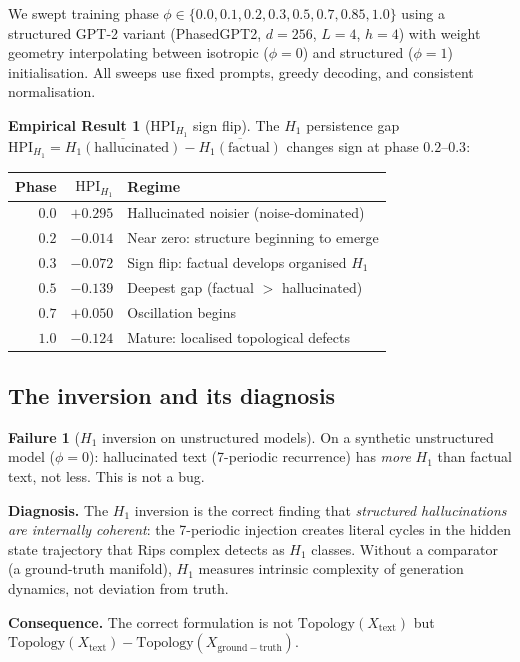 \documentclass[11pt]{amsart}
\theoremstyle{definition}
\newtheorem{empiricalresult}[theorem]{Empirical Result}
\newtheorem{failure}[theorem]{Failure}
\begin{document}
We swept training phase $\phi \in \{0.0, 0.1, 0.2, 0.3, 0.5, 0.7, 0.85, 1.0\}$
using a structured GPT-2 variant (PhasedGPT2, $d=256$, $L=4$, $h=4$)
with weight geometry interpolating between isotropic ($\phi=0$) and
structured ($\phi=1$) initialisation.
All sweeps use fixed prompts, greedy decoding, and consistent normalisation.

\begin{empiricalresult}[HPI$_{H_1}$ sign flip]
\label{result:signflip}
The $H_1$ persistence gap $\mathrm{HPI}_{H_1} = \overline{H_1(\mathrm{hallucinated})} - \overline{H_1(\mathrm{factual})}$
changes sign at phase $0.2$--$0.3$:
\begin{center}
\begin{tabular}{rrl}
\toprule
Phase & $\mathrm{HPI}_{H_1}$ & Regime \\
\midrule
$0.0$ & $+0.295$ & Hallucinated noisier (noise-dominated) \\
$0.2$ & $-0.014$ & Near zero: structure beginning to emerge \\
$0.3$ & $-0.072$ & Sign flip: factual develops organised $H_1$ \\
$0.5$ & $-0.139$ & Deepest gap (factual $> $ hallucinated) \\
$0.7$ & $+0.050$ & Oscillation begins \\
$1.0$ & $-0.124$ & Mature: localised topological defects \\
\bottomrule
\end{tabular}
\end{center}
\end{empiricalresult}

\subsection{The inversion and its diagnosis}

\begin{failure}[$H_1$ inversion on unstructured models]
\label{fail:h1inversion}
On a synthetic unstructured model ($\phi=0$):
hallucinated text (7-periodic recurrence) has \emph{more} $H_1$ than
factual text, not less.
This is not a bug.

\textbf{Diagnosis.} The $H_1$ inversion is the correct finding that
\emph{structured hallucinations are internally coherent}: the 7-periodic
injection creates literal cycles in the hidden state trajectory that Rips
complex detects as $H_1$ classes.
Without a comparator (a ground-truth manifold), $H_1$ measures
intrinsic complexity of generation dynamics, not deviation from truth.

\textbf{Consequence.} The correct formulation is not
$\mathrm{Topology}(X_\mathrm{text})$ but
$\mathrm{Topology}(X_\mathrm{text}) - \mathrm{Topology}(X_\mathrm{ground-truth})$.
\end{failure}
\end{document}
